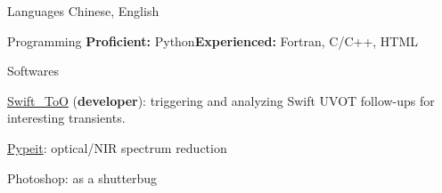 


\begin{cvskills}


\cvskill
{Languages} %
{Chinese, English} %


\cvskill
{Programming} %
{\textbf{Proficient:} Python\quad \textbf{Experienced:} Fortran, C/C++, HTML} %



\cvskill
{Softwares} %
{\begin{cvitems}
    \item {\href{https://github.com/slowdivePTG/Swift_ToO}{Swift\_ToO} (\textbf{developer}): triggering and analyzing Swift UVOT follow-ups for interesting transients.}
    \item \href{https://pypeit.readthedocs.io/en/release/}{Pypeit}: optical/NIR spectrum reduction
    \item Photoshop: as a shutterbug
\end{cvitems}}%

\end{cvskills}